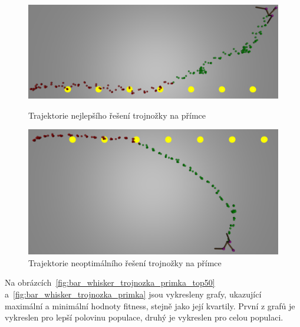 \begin{figure}[h]
    \begin{minipage}[c]{0.48\linewidth}
        \includegraphics[width=\linewidth]{obrazky/trojnozka_primka_zhora_nejlepsi_reseni_trajektorie.png}
        \caption{Trajektorie nejlepšího řešení trojnožky na přímce}
        \label{fig:trojnozka_primka_zhora_nejlepsi_reseni_trajektorie}
    \end{minipage}
    \hfill
    \begin{minipage}[c]{0.48\linewidth}
        \includegraphics[width=\linewidth]{obrazky/trojnozka_primka_zhora_neoptimalni_reseni_trajektorie.png}
        \caption{Trajektorie neoptimálního řešení trojnožky na přímce}
        \label{fig:trojnozka_primka_zhora_neoptimalni_reseni_trajektorie}
    \end{minipage}
\end{figure}

Na obrázcích~\ref{fig:bar_whisker_trojnozka_primka_top50} a~\ref{fig:bar_whisker_trojnozka_primka} jsou vykresleny grafy, ukazující maximální a minimální hodnoty fitness, stejně jako její kvartily.
První z grafů je vykreslen pro lepší polovinu populace, druhý je vykreslen pro celou populaci.

